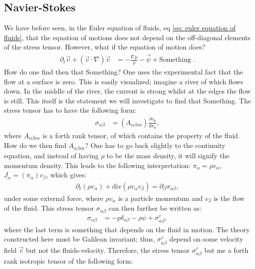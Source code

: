 \documentclass[a4paper]{article}
\begin{document}
\subsection{Navier-Stokes}
We have before seen, in the Euler equation of fluids, eq \eqref{eq: euler equation of fluids}, that the equation of motions does not depend on the off-diagonal elements of the stress tensor. However, what if the equation of motion does?
\begin{align*}
    \partial_t\vec{v} + \left(\vec{v}\cdot\nabla\right)\vec{v} &= - \frac{\nabla p}{\rho} - \vec{\psi} + \text{Something }.
\end{align*}How do one find then that Something? One uses the experimental fact that the flow at a surface is zero. This is easily visualized; imagine a river of which flows down. In the middle of the river, the current is strong whilst at the edges the flow is still.
This itself is the statement we will investigate to find that Something. The stress tensor has to have the following form:
\begin{align*}
    \sigma_{\alpha\beta} &= \left(A_{\alpha\beta\nu\kappa}\right)\frac{\partial v_\mu}{dx_\mu},
\end{align*}where $A_{\alpha\beta\nu\kappa}$ is a forth rank tensor, of which contains the property of the fluid. How do we then find $A_{\alpha\beta\nu\kappa}$? One has to go back slightly to the continuity equation, and instead of having $\rho$ to be the mass density, it will signify the momentum density.
This leads to the following interpretation: $\pi_\alpha = \rho v_\alpha$, $J_\alpha = \left(\pi_\alpha\right) v_\beta$, which gives:
\begin{align*}
    \partial_t\left(\rho v_\alpha\right) + \text{div}\left(\rho v_\alpha v_\beta\right) = \partial_\beta \sigma_{\alpha\beta},
\end{align*}under some external force, where $\rho v_\alpha$ is a particle momentum and $v_\beta$ is the flow of the fluid.
This stress tensor $\sigma_{\alpha\beta}$ can then further be written as:
\begin{align*}
    \sigma_{\alpha\beta} &= -p\delta_{\alpha\beta} - \rho\psi + \sigma_{\alpha\beta}^v,
\end{align*}where the last term is something that depends on the fluid in motion. The theory constructed here must be Galilean invariant; thus, $\sigma_{\alpha\beta}^v$ depend on some velocity field $\vec{v}$ but not the fluids-velocity.
Therefore, the stress tensor $\sigma_{\alpha\beta}^v$ but me a forth rank isotropic tensor of the following form:
\end{document}

